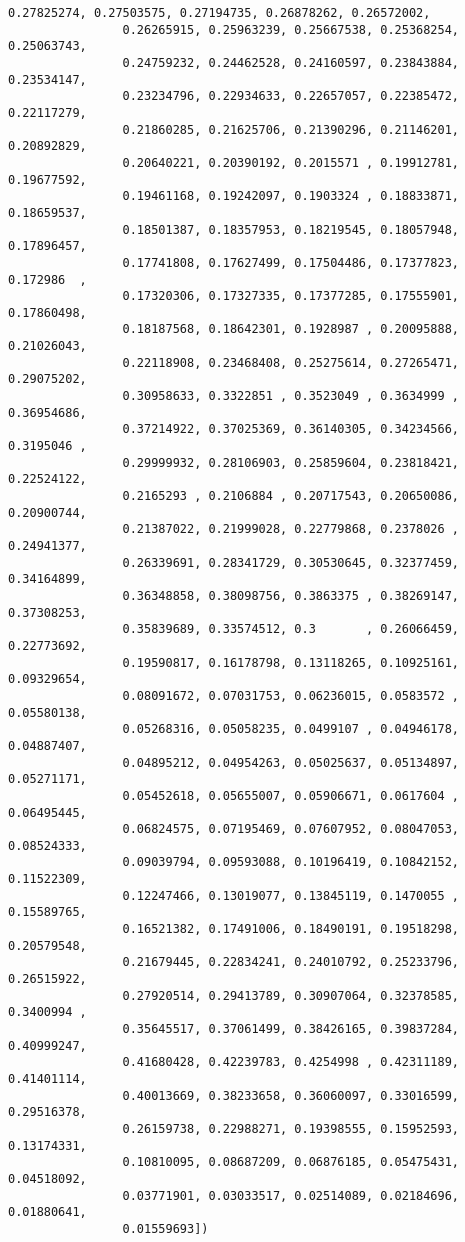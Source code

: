 \documentclass[11pt]{article}
\begin{document}
\begin{Verbatim}[commandchars=\\\{\}]
                0.27825274, 0.27503575, 0.27194735, 0.26878262, 0.26572002,
                0.26265915, 0.25963239, 0.25667538, 0.25368254, 0.25063743,
                0.24759232, 0.24462528, 0.24160597, 0.23843884, 0.23534147,
                0.23234796, 0.22934633, 0.22657057, 0.22385472, 0.22117279,
                0.21860285, 0.21625706, 0.21390296, 0.21146201, 0.20892829,
                0.20640221, 0.20390192, 0.2015571 , 0.19912781, 0.19677592,
                0.19461168, 0.19242097, 0.1903324 , 0.18833871, 0.18659537,
                0.18501387, 0.18357953, 0.18219545, 0.18057948, 0.17896457,
                0.17741808, 0.17627499, 0.17504486, 0.17377823, 0.172986  ,
                0.17320306, 0.17327335, 0.17377285, 0.17555901, 0.17860498,
                0.18187568, 0.18642301, 0.1928987 , 0.20095888, 0.21026043,
                0.22118908, 0.23468408, 0.25275614, 0.27265471, 0.29075202,
                0.30958633, 0.3322851 , 0.3523049 , 0.3634999 , 0.36954686,
                0.37214922, 0.37025369, 0.36140305, 0.34234566, 0.3195046 ,
                0.29999932, 0.28106903, 0.25859604, 0.23818421, 0.22524122,
                0.2165293 , 0.2106884 , 0.20717543, 0.20650086, 0.20900744,
                0.21387022, 0.21999028, 0.22779868, 0.2378026 , 0.24941377,
                0.26339691, 0.28341729, 0.30530645, 0.32377459, 0.34164899,
                0.36348858, 0.38098756, 0.3863375 , 0.38269147, 0.37308253,
                0.35839689, 0.33574512, 0.3       , 0.26066459, 0.22773692,
                0.19590817, 0.16178798, 0.13118265, 0.10925161, 0.09329654,
                0.08091672, 0.07031753, 0.06236015, 0.0583572 , 0.05580138,
                0.05268316, 0.05058235, 0.0499107 , 0.04946178, 0.04887407,
                0.04895212, 0.04954263, 0.05025637, 0.05134897, 0.05271171,
                0.05452618, 0.05655007, 0.05906671, 0.0617604 , 0.06495445,
                0.06824575, 0.07195469, 0.07607952, 0.08047053, 0.08524333,
                0.09039794, 0.09593088, 0.10196419, 0.10842152, 0.11522309,
                0.12247466, 0.13019077, 0.13845119, 0.1470055 , 0.15589765,
                0.16521382, 0.17491006, 0.18490191, 0.19518298, 0.20579548,
                0.21679445, 0.22834241, 0.24010792, 0.25233796, 0.26515922,
                0.27920514, 0.29413789, 0.30907064, 0.32378585, 0.3400994 ,
                0.35645517, 0.37061499, 0.38426165, 0.39837284, 0.40999247,
                0.41680428, 0.42239783, 0.4254998 , 0.42311189, 0.41401114,
                0.40013669, 0.38233658, 0.36060097, 0.33016599, 0.29516378,
                0.26159738, 0.22988271, 0.19398555, 0.15952593, 0.13174331,
                0.10810095, 0.08687209, 0.06876185, 0.05475431, 0.04518092,
                0.03771901, 0.03033517, 0.02514089, 0.02184696, 0.01880641,
                0.01559693])
\end{Verbatim}
            
\end{document}
